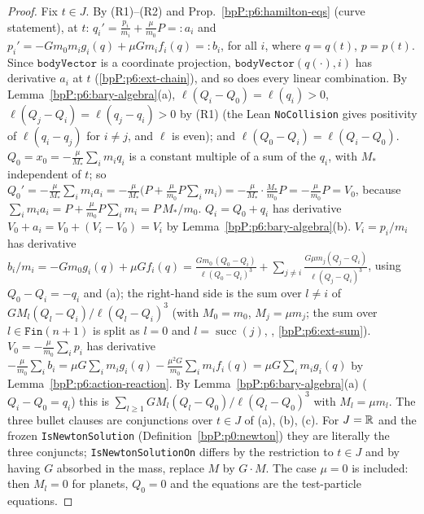 \begin{proof}
\label{stepP:p6:rc-coords} Fix $t\in J$. By (R1)--(R2) and Prop.~\ref{bpP:p6:hamilton-eqs} (curve statement), at $t$:
$q_i'=\frac{p_i}{m_i}+\frac\mu{m_0}P=:a_i$ and $p_i'=-Gm_0m_ig_i(q)+\mu Gm_if_i(q)=:b_i$, for all $i$, where $q=q(t)$, $p=p(t)$. Since $\texttt{bodyVector}$ is a coordinate projection, $\texttt{bodyVector}(q(\cdot),i)$ has derivative $a_i$ at $t$ (\ref{bpP:p6:ext-chain}), and so does every linear combination.
\label{stepP:p6:rc-a} By Lemma~\ref{bpP:p6:bary-algebra}(a), $\ell(Q_i-Q_0)=\ell(q_i)>0$, $\ell(Q_j-Q_i)=\ell(q_j-q_i)>0$ by (R1) (the Lean \texttt{NoCollision} gives positivity of $\ell(q_i-q_j)$ for $i\ne j$, and $\ell$ is even); and $\ell(Q_0-Q_i)=\ell(Q_i-Q_0)$.
\label{stepP:p6:rc-sun} $Q_0=x_0=-\frac\mu{M_*}\sum_im_iq_i$ is a constant multiple of a sum of the $q_i$, with $M_*$ independent of $t$; so $Q_0'=-\frac\mu{M_*}\sum_im_ia_i=-\frac\mu{M_*}\bigl(P+\frac\mu{m_0}P\sum_im_i\bigr)=-\frac\mu{M_*}\cdot\frac{M_*}{m_0}P=-\frac\mu{m_0}P=V_0$, because $\sum_im_ia_i=P+\frac\mu{m_0}P\sum_im_i=P\,M_*/m_0$.
\label{stepP:p6:rc-planets} $Q_i=Q_0+q_i$ has derivative $V_0+a_i=V_0+(V_i-V_0)=V_i$ by Lemma~\ref{bpP:p6:bary-algebra}(b).
\label{stepP:p6:rc-vplanet} $V_i=p_i/m_i$ has derivative $b_i/m_i=-Gm_0g_i(q)+\mu Gf_i(q)=\frac{Gm_0\,(Q_0-Q_i)}{\ell(Q_0-Q_i)^3}+\sum_{j\ne i}\frac{G\mu m_j(Q_j-Q_i)}{\ell(Q_j-Q_i)^3}$, using $Q_0-Q_i=-q_i$ and (a); the right-hand side is the sum over $l\ne i$ of $GM_l(Q_l-Q_i)/\ell(Q_l-Q_i)^3$ (with $M_0=m_0$, $M_j=\mu m_j$; the sum over $l\in\texttt{Fin}(n+1)$ is split as $l=0$ and $l=\operatorname{succ}(j)$, , \ref{bpP:p6:ext-sum}).
\label{stepP:p6:rc-vsun} $V_0=-\frac\mu{m_0}\sum_ip_i$ has derivative $-\frac\mu{m_0}\sum_ib_i=\mu G\sum_im_ig_i(q)-\frac{\mu^2G}{m_0}\sum_im_if_i(q)=\mu G\sum_im_ig_i(q)$ by Lemma~\ref{bpP:p6:action-reaction}. By Lemma~\ref{bpP:p6:bary-algebra}(a) ($Q_i-Q_0=q_i$) this is $\sum_{l\ge1}GM_l(Q_l-Q_0)/\ell(Q_l-Q_0)^3$ with $M_l=\mu m_l$.
\label{stepP:p6:rc-pack} The three bullet clauses are conjunctions over $t\in J$ of (a), (b), (c). For $J=\mathbb{R}$ and the frozen \texttt{IsNewtonSolution} (Definition~\ref{bpP:p0:newton}) they are literally the three conjuncts; \texttt{IsNewtonSolutionOn} differs by the restriction to $t\in J$ and by having $G$ absorbed in the mass, replace $M$ by $G\cdot M$. The case $\mu=0$ is included: then $M_l=0$ for planets, $Q_0=0$ and the equations are the test-particle equations.
\end{proof}
